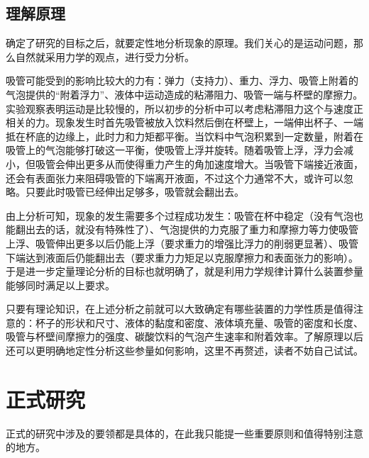 \documentclass[a4paper,10pt,english]{sphinxmanual}
\begin{document}
\subsection{理解原理}
\label{\detokenize{5. Research:id4}}
确定了研究的目标之后，就要定性地分析现象的原理。我们关心的是运动问题，那么自然就采用力学的观点，进行受力分析。

吸管可能受到的影响比较大的力有：弹力（支持力）、重力、浮力、吸管上附着的气泡提供的“附着浮力”、液体中运动造成的粘滞阻力、吸管一端与杯壁的摩擦力。实验观察表明运动是比较慢的，所以初步的分析中可以考虑粘滞阻力这个与速度正相关的力。现象发生时首先吸管被放入饮料然后倒在杯壁上，一端伸出杯子、一端抵在杯底的边缘上，此时力和力矩都平衡。当饮料中气泡积累到一定数量，附着在吸管上的气泡能够打破这一平衡，使吸管上浮并旋转。随着吸管上浮，浮力会减小，但吸管会伸出更多从而使得重力产生的角加速度增大。当吸管下端接近液面，还会有表面张力来阻碍吸管的下端离开液面，不过这个力通常不大，或许可以忽略。只要此时吸管已经伸出足够多，吸管就会翻出去。

由上分析可知，现象的发生需要多个过程成功发生：吸管在杯中稳定（没有气泡也能翻出去的话，就没有特殊性了）、气泡提供的力克服了重力和摩擦力等力使吸管上浮、吸管伸出更多以后仍能上浮（要求重力的增强比浮力的削弱更显著）、吸管下端达到液面后仍能翻出去（要求重力力矩足以克服摩擦力和表面张力的影响）。于是进一步定量理论分析的目标也就明确了，就是利用力学规律计算什么装置参量能够同时满足以上要求。

只要有理论知识，在上述分析之前就可以大致确定有哪些装置的力学性质是值得注意的：杯子的形状和尺寸、液体的黏度和密度、液体填充量、吸管的密度和长度、吸管与杯壁间摩擦力的强度、碳酸饮料的气泡产生速率和附着效率。了解原理以后还可以更明确地定性分析这些参量如何影响，这里不再赘述，读者不妨自己试试。


\section{正式研究}
\label{\detokenize{5. Research:id5}}
正式的研究中涉及的要领都是具体的，在此我只能提一些重要原则和值得特别注意的地方。
\end{document}
